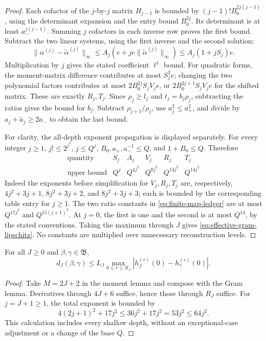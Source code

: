 \begin{proof}
Each cofactor of the \(j\)-by-\(j\) matrix \(H_{j-1}\) is bounded by
\((j-1)!B_0^{2j(j-1)}\), using the determinant expansion and the entry
bound \(B_0^{2j}\). Its determinant is at least
\(a_-^{j(j-1)}\). Summing \(j\) cofactors in each inverse row proves
the first bound. Subtract the two linear systems, using the first inverse
and the second solution:
\[
 \|\alpha^{(j)}-\widetilde\alpha^{(j)}\|_\infty
 \le A_j(e+je\|\widetilde\alpha^{(j)}\|_\infty)
 \le A_j(1+jS_j)e.
\]
Multiplication by \(j\) gives the stated coefficient \(\ell^1\) bound.
For quadratic forms, the moment-matrix difference contributes at most
\(S_j^2e\); changing the two polynomial factors contributes at most
\(2B_0^{2j}S_jV_je\), or \(2B_0^{2j+1}S_jV_je\) for the shifted
matrix. These are exactly \(R_j,T_j\). Since \(\rho_j\ge l_j\) and
\(t_j=b_j\rho_j\), subtracting the ratios gives the bound for \(b_j\).
Subtract \(\rho_{j+1}/\rho_j\), use \(a_j^2\le a_+^2\), and divide by
\(a_j+\widetilde a_j\ge2a_-\) to obtain the last bound.

For clarity, the all-depth exponent propagation is displayed separately.
For every integer \(j\ge1\), \(j!\le2^{j^2}\), \(j\le Q^j\),
\(B_0,a_+,a_-^{-1}\le Q\), and \(1+B_0\le Q\). Therefore
\[
 \begin{array}{c|ccccc}
 \text{quantity}&S_j&A_j&V_j&R_j&T_j\\ \hline
 \text{upper bound}&Q^j&Q^{4j^2}&Q^{8j^2}&Q^{13j^2}&Q^{14j^2}
 \end{array}
\]
Indeed the exponents before simplification for \(V_j,R_j,T_j\) are,
respectively, \(4j^2+3j+1\), \(8j^2+3j+2\), and
\(8j^2+3j+3\); each is bounded by the corresponding table entry for
\(j\ge1\). The two ratio constants in \eqref{eq:finite-map-ledger}
are at most \(Q^{17j^2}\) and \(Q^{15(j+1)^2}\). At \(j=0\), the first
is one and the second is at most \(Q^{14}\), by the stated conventions.
Taking the maximum through \(J\) gives \eqref{eq:effective-gram-lipschitz}.
No constants are multiplied over unnecessary reconstruction levels.
\end{proof}

\begin{theorem}
\label{lem:effective-response-jet}
For all \(J\ge0\) and \(\beta,\gamma\in\mathfrak B\),
\begin{equation}
 d_J(\beta,\gamma)\le L_J\max_{0\le r\le R_J}
 |h_\beta^{(r)}(0)-h_\gamma^{(r)}(0)|.
 \label{eq:effective-jet-inverse}
\end{equation}
\end{theorem}
\begin{proof}
Take \(M=2J+2\) in the moment lemma and compose with the Gram lemma.
Derivatives through \(4J+6\) suffice, hence those through \(R_J\) suffice.
For \(j=J+1\ge1\), the total exponent is bounded by
\[
 4(2j+1)^2+17j^2\le36j^2+17j^2=53j^2\le64j^2.
\]
This calculation includes every shallow depth, without an exceptional-case
adjustment or a change of the base \(Q\).
\end{proof}

